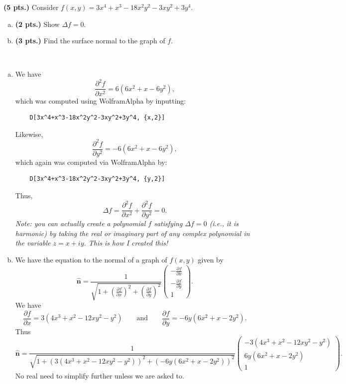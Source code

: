 \documentclass[12pt]{article} %
\newcommand{\unitvec}{\boldsymbol{\hat{n}}}
\begin{document}
\newpage
\begin{problem}
\textbf{(5 pts.)} Consider $f(x,y)= 3x^4+x^3-18x^2y^2-3xy^2+3y^4$.
\begin{enumerate}[(a)]
    \item \textbf{(2 pts.)} Show $\Delta f = 0$.
    \item \textbf{(3 pts.)} Find the surface normal to the graph of $f$.
\end{enumerate}
\end{problem}
\begin{solution}~
\begin{enumerate}[(a)]
    \item We have
    \[
    \frac{\partial^2 f}{\partial x^2} = 6(6x^2+x-6y^2),
    \]
    which was computed using WolframAlpha by inputting:
    \begin{verbatim}
    D[3x^4+x^3-18x^2y^2-3xy^2+3y^4, {x,2}]
    \end{verbatim}
    Likewise,
    \[
    \frac{\partial^2 f}{\partial y^2} = -6(6x^2+x-6y^2),
    \]
    which again was computed via WolframAlpha by:
    \begin{verbatim}
    D[3x^4+x^3-18x^2y^2-3xy^2+3y^4, {y,2}]
    \end{verbatim}
    Thus,
    \[
    \Delta f = \frac{\partial^2 f}{\partial x^2} + \frac{\partial^2 f}{\partial y^2} = 0.
    \]
    \emph{Note: you can actually create a polynomial $f$ satisfying $\Delta f = 0$ (i.e., it is harmonic) by taking the real or imaginary part of any complex polynomial in the variable $z=x+iy$. This is how I created this!}

    \item We have the equation to the normal of a graph of $f(x,y)$ given by
    \[
        \unitvec = \frac{1}{\sqrt{1+\left(\frac{\partial f}{\partial x}\right)^2 + \left(\frac{\partial f}{\partial y}\right)^2}} \begin{pmatrix} -\frac{\partial f}{\partial x} \\ -\frac{\partial f}{\partial y} \\ 1 \end{pmatrix}.
    \]
    We have
    \[
    \frac{\partial f}{\partial x} = 3(4x^3+x^2-12xy^2-y^2) \qquad \textrm{and} \qquad \frac{\partial f}{\partial y} = -6y(6x^2+x-2y^2).
    \]
    Thus
    \[
    \boxed{\unitvec = \frac{1}{\sqrt{1 + \left( 3(4x^3+x^2-12xy^2-y^2) \right)^2 + \left( -6y(6x^2+x-2y^2) \right)^2 }} \begin{pmatrix} -3(4x^3+x^2-12xy^2-y^2) \\ 6y(6x^2+x-2y^2) \\ 1 \end{pmatrix}.}
    \]
    No real need to simplify further unless we are asked to.
\end{enumerate}
\end{solution}
\end{document}
